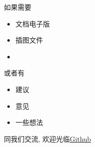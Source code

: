 如果需要
\begin{itemize}
    \item 文档电子版
    \item 插图文件
    \item {}
\end{itemize}
或者有
\begin{itemize}
    \item 建议
    \item 意见
    \item 一些想法
\end{itemize}
同我们交流,
欢迎光临\href{https://github.com/FengYiCDQZ/vector}{Github}